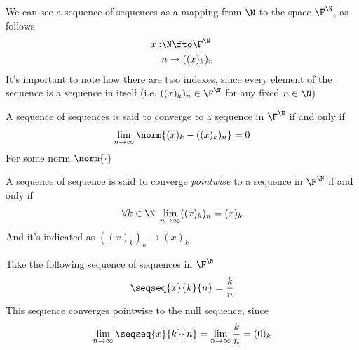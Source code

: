 \documentclass[../mmf.tex]{subfiles}
\begin{document}
\begin{dfn}
	We can see a sequence of sequences as a mapping from $\N$ to the space $\F^\N$, as follows
	\begin{equation*}
		\begin{aligned}
			x:&\N\fto\F^\N\\
			&n\to((x)_k)_n
		\end{aligned}
	\end{equation*}
	It's important to note how there are two indexes, since every element of the sequence is a sequence in itself (i.e. $((x)_k)_n\in\F^\N$ for any fixed $n\in\N$)
\end{dfn}
\begin{dfn}
	A sequence of sequences is said to converge to a sequence in $\F^\N$ if and only if
	\begin{equation}
		\lim_{n\to\infty}\norm{(x)_k-((x)_k)_n}=0
		\label{eq:seqseqconv}
	\end{equation}
	For some norm $\norm{\cdot}$
\end{dfn}
\begin{dfn}
	A sequence of sequence is said to converge \textit{pointwise} to a sequence in $\F^\N$ if and only if
	\begin{equation}
		\forall k\in\N\ \lim_{n\to\infty}((x)_k)_n=(x)_k
		\label{eq:pointwiseconvseqseq}
	\end{equation}
	And it's indicated as $((x)_k)_n\to(x)_k$
\end{dfn}
\begin{eg}
	Take the following sequence of sequences in $\F^\N$
	\begin{equation*}
		\seqseq{x}{k}{n}=\frac{k}{n}
	\end{equation*}
	This sequence converges pointwise to the null sequence, since
	\begin{equation*}
		\lim_{n\to\infty}\seqseq{x}{k}{n}=\lim_{n\to\infty}\frac{k}{n}=(0)_k
	\end{equation*}
\end{eg}
\end{document}
